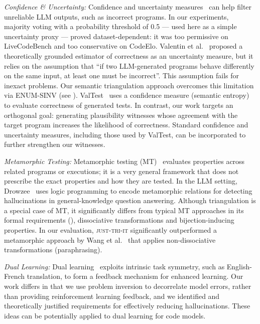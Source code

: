\documentclass[acmsmall,screen,nonacm]{acmart}
\newcommand{\toolName}{\textsc{just-tri-it}\xspace}
\begin{document}
\textit{Confidence \& Uncertainty:} Confidence and uncertainty measures~\cite{spiess2024calibration,ye2024benchmarking} can help filter unreliable LLM outputs, such as incorrect programs. In our experiments, majority voting with a probability threshold of 0.5 --- used here as a simple uncertainty proxy --- proved dataset-dependent: it was too permissive on LiveCodeBench and too conservative on CodeElo. Valentin et al.~\cite{valentin2025estimating} proposed a theoretically grounded estimator of correctness as an uncertainty measure, but it relies on the assumption that ``if two LLM-generated programs behave differently on the same input, at least one must be incorrect''. This assumption fails for inexact problems. Our semantic triangulation approach overcomes this limitation via ENUM-SINV (see ). ValTest~\cite{taherkhani2024valtest} uses a confidence measure (semantic
entropy) to evaluate correctness of generated tests. In contrast, our work targets an orthogonal goal: generating plausibility witnesses whose agreement with the target program increases the likelihood of correctness. Standard confidence and uncertainty measures, including those used by ValTest, can be incorporated to further strengthen our witnesses.

\textit{Metamorphic Testing:} Metamorphic testing (MT)~\cite{chen2018metamorphic} evaluates properties across related programs or executions; it is a very general framework that does not prescribe the exact properties and how they are tested. In the LLM setting, Drowzee~\cite{chen2018metamorphic} uses logic programming to encode metamorphic relations for detecting hallucinations in general-knowledge question answering. Although triangulation is a special case of MT, it significantly differs from typical MT approaches in its formal requirements (), dissociative transformations and bijection-inducing properties. In our evaluation, \toolName significantly outperformed a metamorphic approach by Wang et al.~\cite{wang2024validating} that applies non-dissociative transformations (paraphrasing).

\textit{Dual Learning:} Dual learning~\cite{he2016dual,dognin2020dualtkb} exploits intrinsic task symmetry, such as English-French translation, to form a feedback mechanism for enhanced learning. Our work differs in that we use problem inversion to decorrelate model errors, rather than providing reinforcement learning feedback, and we identified and theoretically justified requirements for effectively reducing hallucinations. These ideas can be potentially applied to dual learning for code models.
\end{document}
